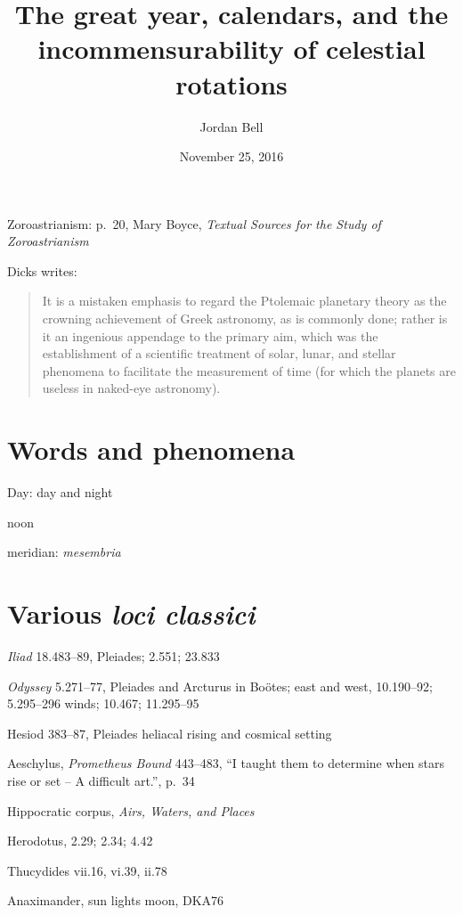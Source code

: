 \documentclass{article}
\begin{document}
\title{The great year, calendars, and the incommensurability of celestial rotations}
\author{Jordan Bell}
\date{November 25, 2016}

\maketitle

Zoroastrianism: p.~20, Mary Boyce, {\em Textual Sources for the Study of Zoroastrianism}

Dicks \cite[p.~26]{dicks} writes:

\begin{quote}
It is a mistaken emphasis to regard the Ptolemaic planetary theory as the crowning achievement of
Greek astronomy, as is commonly done; rather is it an ingenious appendage to the primary
aim, which was the establishment of a scientific treatment
of solar, lunar, and stellar phenomena to facilitate the measurement
of time (for which the planets are useless in naked-eye astronomy).
\end{quote}






\section{Words and phenomena}
Day: day and night

noon

meridian: {\em mesembria}




\section{Various {\em loci classici}}
{\em Iliad} 18.483--89, Pleiades; 2.551; 23.833

{\em Odyssey} 5.271--77, Pleiades and Arcturus in Bo\"otes; east and west, 10.190--92; 5.295--296 winds; 
10.467; 11.295--95

Hesiod 383--87, Pleiades heliacal rising and cosmical setting

Aeschylus, {\em Prometheus Bound} 443--483, ``I taught them to determine when stars rise or set -- A difficult art.'', p.~34

Hippocratic corpus, {\em Airs, Waters, and Places} 

Herodotus, 2.29; 2.34; 4.42

Thucydides vii.16, vi.39, ii.78

Anaximander, sun lights moon, DKA76
\end{document}
